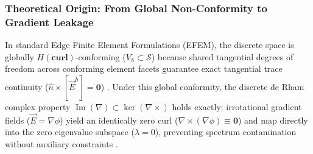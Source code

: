 \documentclass[preprint,12pt]{elsarticle}
\begin{document}
\subsubsection{Theoretical Origin: From Global Non-Conformity to Gradient Leakage}
\label{subsubsec:theoretical_origin_leakage}
In standard Edge Finite Element Formulations (EFEM), the discrete space is globally $H(\mathbf{curl})$-conforming ($V_h \subset \mathcal{S}$) because shared tangential degrees of freedom across conforming element facets guarantee exact tangential trace continuity ($\hat{n} \times [\vec{E}^h] = \mathbf{0}$) \cite{monk2003finite, bossavit1998computational}. Under this global conformity, the discrete de Rham complex property $\operatorname{Im}(\nabla) \subset \ker(\nabla \times)$ holds exactly: irrotational gradient fields ($\vec{E} = \nabla \phi$) yield an identically zero curl ($\nabla \times (\nabla \phi) \equiv \mathbf{0}$) and map directly into the zero eigenvalue subspace ($\lambda = 0$), preventing spectrum contamination without auxiliary constraints \cite{monk2003finite, boffi1999computational, boffi2013mixed}.
\end{document}
